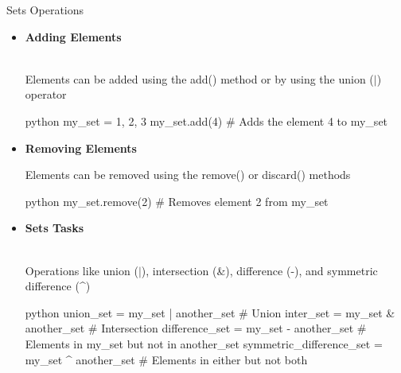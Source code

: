 \documentclass[
	11pt, 
]{beamer}
\begin{document}
\begin{frame}[fragile]{Sets Operations}
\scriptsize
\begin{itemize}
    \item \textbf{Adding Elements} \\ \\ \smallskip

    Elements can be added using the add() method or by using the union ($\vert$) operator
    
\begin{mintedbox}{python} 
my_set = {1, 2, 3}
my_set.add(4) # Adds the element 4 to my_set
\end{mintedbox}

    \item \textbf{Removing Elements}
    
    Elements can be removed using the remove() or discard() methods
    
    \begin{mintedbox}{python}
my_set.remove(2) # Removes element 2 from my_set
    \end{mintedbox}

    \item \textbf{Sets Tasks} \\ \\ \smallskip

     Operations like union ($\vert$), intersection (\&), difference (-), and symmetric difference (\^{})
     
\begin{mintedbox}{python}
union_set = my_set | another_set  # Union 
inter_set = my_set & another_set  # Intersection
difference_set = my_set - another_set  
# Elements in my_set but not in another_set
symmetric_difference_set = my_set ^ another_set  
# Elements in either but not both
\end{mintedbox}

\end{itemize}
\end{frame}



\end{document}
